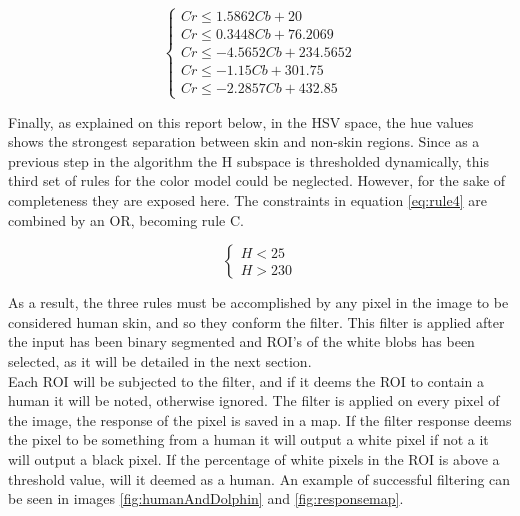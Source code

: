 \begin{equation}
		\begin{cases}
			Cr \le 1.5862  Cb + 20         \\
			Cr \le 0.3448  Cb + 76.2069     \\
			Cr \le -4.5652  Cb + 234.5652   \\
			Cr \le -1.15 Cb + 301.75       \\
			Cr \le -2.2857 Cb + 432.85
			\end{cases}
		\label{eq:rule3}
\end{equation}

Finally, as explained on this report below, in the HSV space, the hue values shows the strongest separation between skin and non-skin regions. 
Since as a previous step in the algorithm the H subspace is thresholded dynamically, this third set of rules for the color model could be neglected. However, for the sake of completeness they are exposed here.
The constraints in equation \ref{eq:rule4} are combined by an OR, becoming rule C.

\begin{equation}
		\begin{cases}
			H < 25   \\
			H > 230
		\end{cases}
	\label{eq:rule4}
\end{equation}

As a result, the three rules must be accomplished by any pixel in the image to be considered human skin, and so they conform the filter.
This filter is applied after the input has been binary segmented and  ROI's of the white blobs has been selected, as it will be detailed in the next section.\\

Each ROI will be subjected to the filter, and if it deems the ROI to contain a human it will be noted, otherwise ignored. 
The filter is applied on every pixel of the image, the response of the pixel is saved in a map. 
If the filter response deems the pixel to be something from a human it will output a white pixel if not a it will output a black pixel.  
If the percentage of white pixels in the ROI is above a threshold value, will it deemed as a human.
An example of successful filtering can be seen in images \ref{fig:humanAndDolphin} and \ref{fig:responsemap}. 

